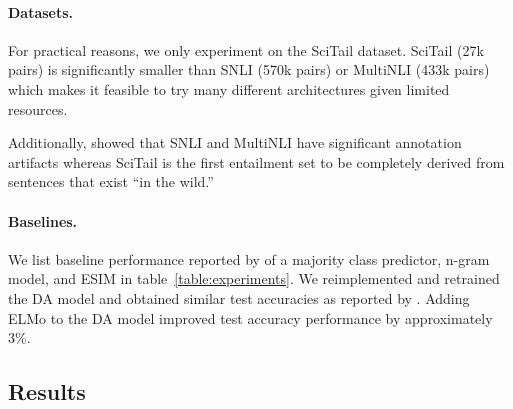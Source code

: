 \documentclass[11pt,a4paper]{article}
\begin{document}
\paragraph{Datasets.}
For practical reasons, we only experiment on the SciTail dataset. SciTail (27k pairs) is
significantly smaller than SNLI (570k pairs) \citep{Bowman2015-is} or MultiNLI (433k pairs)
\citep{Williams2017-uh} which makes it feasible to try many different
architectures given limited resources.

Additionally, \citet{Gururangan2018-lj} showed that SNLI and MultiNLI
have significant annotation artifacts whereas SciTail is the first entailment set to be
completely derived from sentences that exist ``in the wild.''

\paragraph{Baselines.}
We list baseline performance reported by \citet{Khot2018-th} of a majority class predictor,
n-gram model, and ESIM \citep{Chen2016-wl} in table~\ref{table:experiments}. We reimplemented
and retrained the DA model and obtained similar test accuracies as reported by \citet{Chen2016-wl}.
Adding ELMo to the DA model improved test accuracy performance by approximately 3\%.

\subsection{Results}

\begin{table}[h]
\centering
{}
\caption{Dev and test accuracies on SciTail.}
\label{table:experiments}
\end{table}
\end{document}
